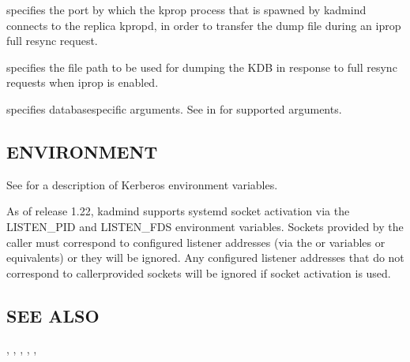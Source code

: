 \documentclass[letterpaper,10pt,english]{sphinxmanual}
\begin{document}
\begin{description}
\sphinxAtStartPar
specifies the port by which the kprop process that is spawned by
kadmind connects to the replica kpropd, in order to transfer the
dump file during an iprop full resync request.

\sphinxAtStartPar
specifies the file path to be used for dumping the KDB in response
to full resync requests when iprop is enabled.

\sphinxAtStartPar
specifies database\sphinxhyphen{}specific arguments.  See {\hyperref[\detokenize{admin/admin_commands/kadmin_local:dboptions}]{}} in {\hyperref[\detokenize{admin/admin_commands/kadmin_local:kadmin-1}]{}} for supported arguments.

\end{description}


\subsection{ENVIRONMENT}
\label{\detokenize{admin/admin_commands/kadmind:environment}}
\sphinxAtStartPar
See  for a description of Kerberos environment
variables.

\sphinxAtStartPar
As of release 1.22, kadmind supports systemd socket activation via the
LISTEN\_PID and LISTEN\_FDS environment variables.  Sockets provided by
the caller must correspond to configured listener addresses (via the
 or  variables or equivalents) or
they will be ignored.  Any configured listener addresses that do not
correspond to caller\sphinxhyphen{}provided sockets will be ignored if socket
activation is used.


\subsection{SEE ALSO}
\label{\detokenize{admin/admin_commands/kadmind:see-also}}
\sphinxAtStartPar
{}, {\hyperref[\detokenize{admin/admin_commands/kadmin_local:kadmin-1}]{}}, {\hyperref[\detokenize{admin/admin_commands/kdb5_util:kdb5-util-8}]{}},
{\hyperref[\detokenize{admin/admin_commands/kdb5_ldap_util:kdb5-ldap-util-8}]{}}, {\hyperref[\detokenize{admin/conf_files/kadm5_acl:kadm5-acl-5}]{}}, 
\end{document}
